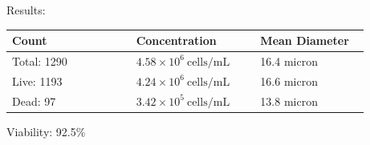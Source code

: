\documentclass[UTF8,10pt,a4paper,fontset=fandol]{ctexart}
\newcommand{\fieldvalue}[1]{#1}
\begin{document}
\vspace{1em}

\noindent Results:

\vspace{0.4em}

\noindent
\begin{tabular}{@{}p{0.32\linewidth}p{0.32\linewidth}p{0.28\linewidth}@{}}
\textbf{Count} & \textbf{Concentration} & \textbf{Mean Diameter} \\
\hline
Total:
\fieldvalue{1290}
&
\fieldvalue{$4.58 \times 10^{6}\ \mathrm{cells/mL}$}
&
\fieldvalue{16.4 micron}
\\
Live:
\fieldvalue{1193}
&
\fieldvalue{$4.24 \times 10^{6}\ \mathrm{cells/mL}$}
&
\fieldvalue{16.6 micron}
\\
Dead:
\fieldvalue{97}
&
\fieldvalue{$3.42 \times 10^{5}\ \mathrm{cells/mL}$}
&
\fieldvalue{13.8 micron}
\end{tabular}

\vspace{0.8em}

Viability:
\fieldvalue{92.5\%}

\vspace{1em}

\noindent
\begin{minipage}[t]{0.43\linewidth}
\centering
\fbox{\rule{0pt}{1.8in}\rule{0.95\linewidth}{0pt}}\\[-0.2em]
\end{minipage}
\hfill
\begin{minipage}[t]{0.43\linewidth}
\centering
\fbox{\rule{0pt}{1.8in}\rule{0.95\linewidth}{0pt}}\\[-0.2em]
\end{minipage}

\vspace{1.2em}

\noindent
\begin{minipage}[t]{0.43\linewidth}
\centering
\fbox{\rule{0pt}{1.8in}\rule{0.95\linewidth}{0pt}}\\[-0.2em]
\end{minipage}
\hfill
\begin{minipage}[t]{0.43\linewidth}
\centering
\fbox{\rule{0pt}{1.8in}\rule{0.95\linewidth}{0pt}}\\[-0.2em]
\end{minipage}
\end{document}

